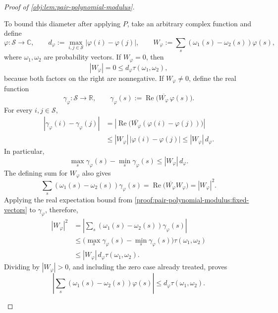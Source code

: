 \documentclass[11pt]{article}
\begin{document}
\begin{proof}[Proof of \cref{obj:lem:pair-polynomial-modulus}]
\begin{enumerate}
To bound this diameter after applying \(P\), take an arbitrary complex function and define
\[
\varphi:\mathcal S\to\mathbb C,\qquad
d_\varphi:=\max_{i,j\in\mathcal S}|\varphi(i)-\varphi(j)|,
\qquad
W_\varphi:=\sum_s(\omega_1(s)-\omega_2(s))\varphi(s),
\]
where \(\omega_1,\omega_2\) are probability vectors.
If \(W_\varphi=0\), then
\[
|W_\varphi|=0\le d_\varphi\tau(\omega_1,\omega_2),
\]
because both factors on the right are nonnegative.
If \(W_\varphi\ne0\), define the real function
\[
\gamma_\varphi:\mathcal S\to\mathbb R,\qquad
\gamma_\varphi(s):=
\operatorname{Re}\bigl(\overline{W_\varphi}\,\varphi(s)\bigr).
\]
For every \(i,j\in\mathcal S\),
\[
\begin{aligned}
|\gamma_\varphi(i)-\gamma_\varphi(j)|
&=\left|\operatorname{Re}
  \bigl(\overline{W_\varphi}(\varphi(i)-\varphi(j))\bigr)\right|\\
&\le |W_\varphi|\,|\varphi(i)-\varphi(j)|
\le |W_\varphi|\,d_\varphi.
\end{aligned}
\]
In particular,
\[
\max_s\gamma_\varphi(s)-\min_s\gamma_\varphi(s)
\le |W_\varphi|\,d_\varphi.
\]
The defining sum for \(W_\varphi\) also gives
\[
\sum_s(\omega_1(s)-\omega_2(s))\gamma_\varphi(s)
=\operatorname{Re}\bigl(\overline{W_\varphi}W_\varphi\bigr)
=|W_\varphi|^2.
\]
Applying the real expectation bound from \cref{proof:pair-polynomial-modulus:fixed-vectors} to
\(\gamma_\varphi\), therefore,
\[
\begin{aligned}
|W_\varphi|^2
&=\left|\sum_s(\omega_1(s)-\omega_2(s))\gamma_\varphi(s)\right|\\
&\le
\bigl(\max_s\gamma_\varphi(s)-\min_s\gamma_\varphi(s)\bigr)
\tau(\omega_1,\omega_2)\\
&\le |W_\varphi|\,d_\varphi\tau(\omega_1,\omega_2).
\end{aligned}
\]
Dividing by \(|W_\varphi|>0\), and including the zero case already treated, proves
\[
\left|\sum_s(\omega_1(s)-\omega_2(s))\varphi(s)\right|
\le d_\varphi\tau(\omega_1,\omega_2).
\]


\end{enumerate}
\end{proof}
\end{document}
